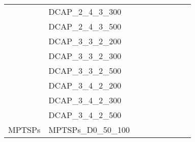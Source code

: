 \begin{table}[]
{\begin{tabular}{|c|l|ll|ll|l|l|l|}
			& DCAP\_2\_4\_3\_300            &                                 &                                &                                  &                                 &                                    &                            &                            \\
			& DCAP\_2\_4\_3\_500            &                                 &                                &                                  &                                 &                                    &                            &                            \\
			& DCAP\_3\_3\_2\_200            &                                 &                                &                                  &                                 &                                    &                            &                            \\
			& DCAP\_3\_3\_2\_300            &                                 &                                &                                  &                                 &                                    &                            &                            \\
			& DCAP\_3\_3\_2\_500            &                                 &                                &                                  &                                 &                                    &                            &                            \\
			& DCAP\_3\_4\_2\_200            &                                 &                                &                                  &                                 &                                    &                            &                            \\
			& DCAP\_3\_4\_2\_300            &                                 &                                &                                  &                                 &                                    &                            &                            \\
			& DCAP\_3\_4\_2\_500            &                                 &                                &                                  &                                 &                                    &                            &                            \\ \hline
			\multirow{4}{*}{MPTSPs}  & MPTSPs\_D0\_50\_100           &                                 &                                &                                  &                                 &                                    &                            &                            \\

\end{tabular}}
\end{table}
